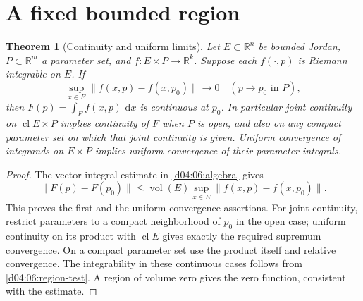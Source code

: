 \documentclass[11pt,oneside,openany]{book}
\newtheorem{theorem}{Theorem}[chapter]
\theoremstyle{definition}
\theoremstyle{remark}
\newcommand{\R}{\mathbb R}
\newcommand{\norm}[1]{\lVert#1\rVert}
\newcommand{\dd}{\,\mathrm d}
\DeclareMathOperator{\vol}{vol}
\DeclareMathOperator{\cl}{cl}
\newcommand{\family}[1]{}
\begin{document}
\section{A fixed bounded region}
\family{K04.08.01}
\begin{theorem}[Continuity and uniform limits]\label{d04:08:continuity}
Let $E\subset\R^n$ be bounded Jordan, $P\subset\R^m$ a parameter set, and $f:E\times P\to\R^k$. Suppose each $f(\cdot,p)$ is Riemann integrable on $E$. If
\[
 \sup_{x\in E}\norm{f(x,p)-f(x,p_0)}\longrightarrow0\quad(p\to p_0\text{ in }P),
\]
then $F(p)=\int_E f(x,p)\,\dd x$ is continuous at $p_0$. In particular joint continuity on $\cl E\times P$ implies continuity of $F$ when $P$ is open, and also on any compact parameter set on which that joint continuity is given. Uniform convergence of integrands on $E\times P$ implies uniform convergence of their parameter integrals.
\end{theorem}
\begin{proof}
The vector integral estimate in \cref{d04:06:algebra} gives
\[
 \norm{F(p)-F(p_0)}\leq\vol(E)\sup_{x\in E}\norm{f(x,p)-f(x,p_0)}.
\]
This proves the first and the uniform-convergence assertions. For joint continuity, restrict parameters to a compact neighborhood of $p_0$ in the open case; uniform continuity on its product with $\cl E$ gives exactly the required supremum convergence. On a compact parameter set use the product itself and relative convergence. The integrability in these continuous cases follows from \cref{d04:06:region-test}. A region of volume zero gives the zero function, consistent with the estimate.
\end{proof}
\end{document}
